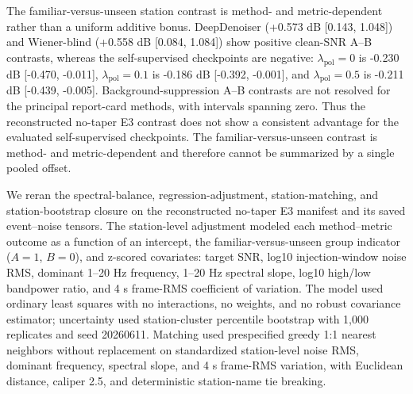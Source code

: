 \documentclass[review,12pt,authoryear]{elsarticle}
\newcommand{\lpol}{\lambda_{\mathrm{pol}}}
\begin{document}
The familiar-versus-unseen station contrast is method- and metric-dependent rather than a uniform additive bonus. DeepDenoiser (+0.573 dB [0.143, 1.048]) and Wiener-blind (+0.558 dB [0.084, 1.084]) show positive clean-SNR A--B contrasts, whereas the self-supervised checkpoints are negative: $\lpol=0$ is -0.230 dB [-0.470, -0.011], $\lpol=0.1$ is -0.186 dB [-0.392, -0.001], and $\lpol=0.5$ is -0.211 dB [-0.439, -0.005]. Background-suppression A--B contrasts are not resolved for the principal report-card methods, with intervals spanning zero. Thus the reconstructed no-taper E3 contrast does not show a consistent advantage for the evaluated self-supervised checkpoints. The familiar-versus-unseen contrast is method- and metric-dependent and therefore cannot be summarized by a single pooled offset.

We reran the spectral-balance, regression-adjustment, station-matching, and station-bootstrap closure on the reconstructed no-taper E3 manifest and its saved event--noise tensors. The station-level adjustment modeled each method--metric outcome as a function of an intercept, the familiar-versus-unseen group indicator ($A=1$, $B=0$), and z-scored covariates: target SNR, log10 injection-window noise RMS, dominant 1--20 Hz frequency, 1--20 Hz spectral slope, log10 high/low bandpower ratio, and 4 s frame-RMS coefficient of variation. The model used ordinary least squares with no interactions, no weights, and no robust covariance estimator; uncertainty used station-cluster percentile bootstrap with 1,000 replicates and seed 20260611. Matching used prespecified greedy 1:1 nearest neighbors without replacement on standardized station-level noise RMS, dominant frequency, spectral slope, and 4 s frame-RMS variation, with Euclidean distance, caliper 2.5, and deterministic station-name tie breaking.
\end{document}

